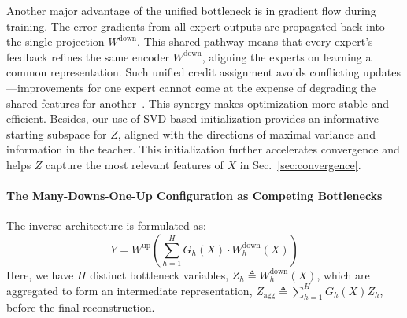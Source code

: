 \documentclass{article} %
\begin{document}
Another major advantage of the unified bottleneck is in gradient flow during training. The error gradients from all expert outputs are propagated back into the single projection $W^{\text{down}}$. This shared pathway means that every expert's feedback refines the same encoder $W^{\text{down}}$, aligning the experts on learning a common representation. Such unified credit assignment avoids conflicting updates—improvements for one expert cannot come at the expense of degrading the shared features for another~\citep{samejima2003inter,mu2025comprehensive}. This synergy makes optimization more stable and efficient. Besides, our use of SVD-based initialization provides an informative starting subspace for $Z$, aligned with the directions of maximal variance and information in the teacher. This initialization further accelerates convergence and helps $Z$ capture the most relevant features of $X$ in Sec.~\ref{sec:convergence}.

\paragraph{The Many-Downs-One-Up Configuration as Competing Bottlenecks}

The inverse architecture is formulated as:
\begin{equation}
    Y = W^{\text{up}}\left(\sum_{h=1}^{H} G_h(X) \cdot W^{\text{down}}_h(X)\right)
    \label{eq:many_downs}
\end{equation}
Here, we have $H$ distinct bottleneck variables, $Z_h \triangleq W^{\text{down}}_h(X)$, which are aggregated to form an intermediate representation, $Z_{\text{agg}} \triangleq \sum_{h=1}^{H} G_h(X) Z_h$, before the final reconstruction.
\end{document}
